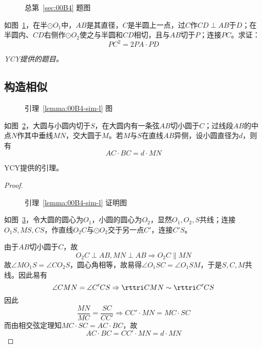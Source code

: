 

\begin{figure}[htbp]
  \centering {}
  \caption{总第~\ref{sec:00B4} 题图}
  \label{fig:00B4}
\end{figure}

如图~\ref{fig:00B4}，在半$\odot O_1$中，$AB$是其直径，$C$是半圆上一点，过$C$作$CD \perp AB$于$D$；在半圆内、$CD$右侧作$\odot O_2$使之与半圆和$CD$相切，且与$AB$切于$P$；连接$PC$。求证：
\[ PC^2 = 2PA\cdot PD \]

\emph{YCY提供的题目。}

\subsection{构造相似} \label{subsec:00B4-sim}

\begin{lemma} \label{lemma:00B4-sim-l}
  \begin{figure}
    \centering {}
    \caption{引理~\ref{lemma:00B4-sim-l} 图}
    \label{fig:00B4-sim-l}
  \end{figure}

  如图~\ref{fig:00B4-sim-l}，大圆与小圆内切于$S$，在大圆内有一条弦$AB$切小圆于$C$；过线段$AB$的中点$N$作其中垂线$MN$，交大圆于$M$。若$M$与$S$在直线$AB$异侧，设小圆直径为$d$，则有
  \[ AC \cdot BC = d \cdot MN \]

  YCY提供的引理。
\end{lemma}

\begin{proof}
  \begin{figure}[htbp]
    \centering {}
    \caption{引理~\ref{lemma:00B4-sim-l} 证明图}
    \label{fig:00B4-sim-lp}
  \end{figure}

  如图~\ref{fig:00B4-sim-lp}，令大圆的圆心为$O_1$，小圆的圆心为$O_2$，显然$O_1, O_2, S$共线；连接$O_1S, MS, CS$，作直线$O_2C$与$\odot O_2$交于另一点$C'$，连接$C'S$。

  由于$AB$切小圆于$C$，故
  \[ O_2C \perp AB, MN \perp AB \Rightarrow O_2C \parallel MN \]
  故$\angle MO_1S = \angle CO_2S$，圆心角相等，故易得$\angle O_1SC = \angle O_1SM$，于是$S, C, M$共线。因此易有
  \[ \angle CMN = \angle C'CS \Rightarrow \rttri CMN \sim \rttri C'CS \]
  因此
  \[ \frac{MN}{MC} = \frac{SC}{CC'} \Rightarrow CC' \cdot MN = MC \cdot SC \]
  而由相交弦定理知$MC\cdot SC = AC\cdot BC$，故
  \[ AC \cdot BC = CC' \cdot MN = d \cdot MN \]
\end{proof}

